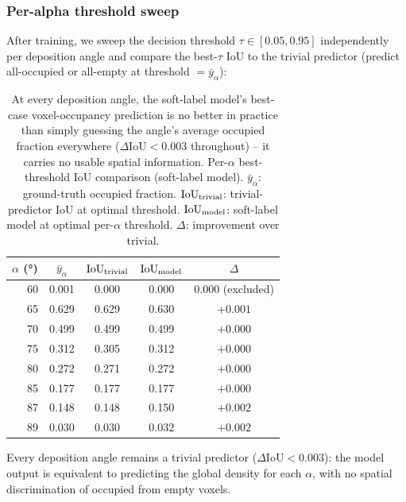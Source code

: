\documentclass[aip,amsmath,amssymb,reprint]{revtex4-1}
\renewcommand{\ang}{\ensuremath{\alpha}} %
\newcommand{\iou}{\ensuremath{\mathrm{IoU}}}
\begin{document}
\subsubsection{Per-alpha threshold sweep}

After training, we sweep the decision threshold $\tau \in [0.05, 0.95]$
independently per deposition angle and compare the best-$\tau$ IoU
to the trivial predictor (predict all-occupied or all-empty at
threshold $= \bar{y}_\alpha$):

\begin{table}[htbp]
  \centering
  \caption{%
    At every deposition angle, the soft-label model's best-case
    voxel-occupancy prediction is no better in practice than
    simply guessing the angle's average occupied fraction
    everywhere ($\Delta\iou < 0.003$ throughout) -- it carries no
    usable spatial information.
    Per-$\alpha$ best-threshold IoU comparison (soft-label model).
    $\bar{y}_\alpha$: ground-truth occupied fraction.
    $\iou_{\rm trivial}$: trivial-predictor IoU at optimal threshold.
    $\iou_{\rm model}$: soft-label model at optimal per-$\alpha$ threshold.
    $\Delta$: improvement over trivial.
  }
  \label{tab:soft_iou}
  \begin{tabular}{rcccc}
    \toprule
    $\ang$ (°) & $\bar{y}_\alpha$ & $\iou_{\rm trivial}$ & $\iou_{\rm model}$ & $\Delta$ \\
    \midrule
    60 & 0.001 & 0.000 & 0.000 & 0.000 (excluded) \\
    65 & 0.629 & 0.629 & 0.630 & $+0.001$ \\
    70 & 0.499 & 0.499 & 0.499 & $+0.000$ \\
    75 & 0.312 & 0.305 & 0.312 & $+0.000$ \\
    80 & 0.272 & 0.271 & 0.272 & $+0.000$ \\
    85 & 0.177 & 0.177 & 0.177 & $+0.000$ \\
    87 & 0.148 & 0.148 & 0.150 & $+0.002$ \\
    89 & 0.030 & 0.030 & 0.032 & $+0.002$ \\
    \bottomrule
  \end{tabular}
\end{table}

Every deposition angle remains a trivial predictor ($\Delta\iou < 0.003$):
the model output is equivalent to predicting the global density
for each $\ang$, with no spatial discrimination of occupied from
empty voxels.

\end{document}
